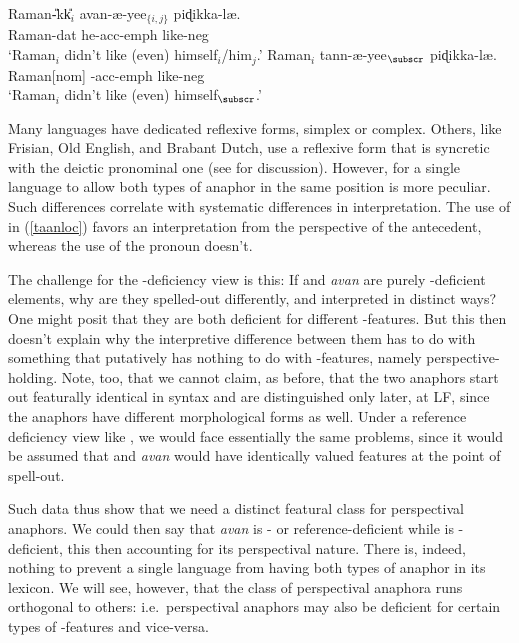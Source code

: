 \documentclass[output=paper, modfonts, nonflat]{langsci/langscibook}
\begin{document}
\ea\label{avanloc}\gll Raman-\U{}kk\U{}$_i$ avan-æ-yee$_{\{i,j\}}$ piɖikka-læ.\\
Raman-{\sc dat} he-{\sc acc-emph} like-{\sc neg}\\
\glt `Raman$_i$ didn't like (even) himself$_i$/him$_j$.'
\ex\label{taanloc}\gll Raman$_i$ tann-æ-yee$_\subscr$ piɖikka-læ.\\
Raman[{\sc nom}] \anaph-{\sc acc-emph} like-{\sc neg}\\
\glt `Raman$_i$ didn't like (even) himself$_\subscr$.'  \z

\noindent Many languages have dedicated reflexive forms, simplex or
complex. Others, like Frisian, Old English, and Brabant Dutch, use a
reflexive form that is syncretic with the deictic pronominal one (see
\citealt{roorwyn:2011} for discussion). However, for a single language
to allow both types of anaphor in the same position is more
peculiar. Such differences correlate with systematic differences in
interpretation. The use of \taan{} in (\ref{taanloc}) \taan{} favors
an interpretation from the perspective of the antecedent, whereas the
use of the pronoun doesn't.

The challenge for the \ph-deficiency view is this: If \taan{} and
\textit{avan} are purely \ph-deficient elements, why are they
spelled-out differently, and interpreted in distinct ways?  One might
posit that they are both deficient for different \ph-features. But
this then doesn't explain why the interpretive difference between them
has to do with something that putatively has nothing to do with
\ph-features, namely perspective-holding. Note, too, that we cannot
claim, as before, that the two anaphors start out featurally identical
in syntax and are distinguished only later, at LF, since the anaphors
have different morphological forms as well. Under a reference
deficiency view like \citet{Hicks:2009}, we would face essentially the
same problems, since it would be assumed that \taan{} and
\textit{avan} would have identically valued \var{} features at the
point of spell-out.

Such data thus show that we need a distinct featural class for
perspectival anaphors. We could then say that \textit{avan} is \ph- or
reference-deficient while \taan{} is \dep-deficient, this then
accounting for its perspectival nature. There is, indeed, nothing to
prevent a single language from having both types of anaphor in its
lexicon. We will see, however, that the class of perspectival anaphora
runs orthogonal to others: i.e.\ perspectival anaphors may also be
deficient for certain types of \ph-features and vice-versa.
\end{document}
